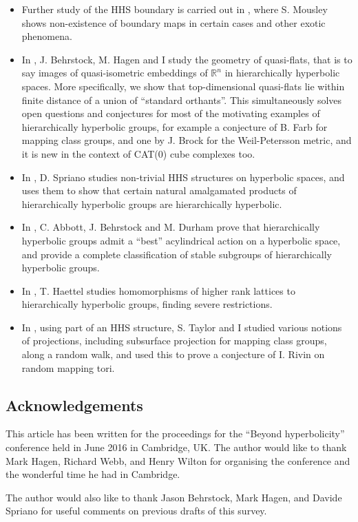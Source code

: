 \documentclass[11pt,oneside]{amsart}
\theoremstyle{definition}
\begin{document}
\begin{itemize}
 \item Further study of the HHS boundary is carried out in \cite{Mousley1,Mousley2}, where S. Mousley shows non-existence of boundary maps in certain cases and other exotic phenomena.
 \item  In \cite{HHS_quasiflats}, J. Behrstock, M. Hagen and I study the geometry of quasi-flats, that is to say images of quasi-isometric embeddings of $\mathbb  R^n$ in hierarchically hyperbolic spaces. More specifically, we show that top-dimensional quasi-flats lie within finite distance of a union of ``standard orthants''. This simultaneously solves open questions and conjectures for most of the motivating examples of hierarchically hyperbolic groups, for example a conjecture of B. Farb for mapping class groups, and one by J. Brock for the Weil-Petersson metric, and it is new in the context of CAT(0) cube complexes too.
 \item In \cite{Spriano}, D. Spriano studies non-trivial HHS structures on hyperbolic spaces, and uses them to show that certain natural amalgamated products of hierarchically hyperbolic groups are hierarchically hyperbolic.
 \item In \cite{HHS_stable}, C. Abbott, J. Behrstock and M. Durham prove that hierarchically hyperbolic groups admit a ``best'' acylindrical action on a hyperbolic space, and provide a complete classification of stable subgroups of hierarchically hyperbolic groups.
 \item In \cite{Haettel:morphism}, T. Haettel studies homomorphisms of higher rank lattices to hierarchically hyperbolic groups, finding severe restrictions.
 \item In \cite{largest_random}, using part of an HHS structure, S. Taylor and I studied various notions of projections, including subsurface projection for mapping class groups, along a random walk, and used this to prove a conjecture of I. Rivin on random mapping tori.
\end{itemize}


\subsection*{Acknowledgements} This article has been written for the proceedings for the ``Beyond hyperbolicity'' conference held in June 2016 in Cambridge, UK. The author would like to thank Mark Hagen, Richard Webb, and Henry Wilton for organising the conference and the wonderful time he had in Cambridge.

The author would also like to thank Jason Behrstock, Mark Hagen, and Davide Spriano for useful comments on previous drafts of this survey.
\end{document}
